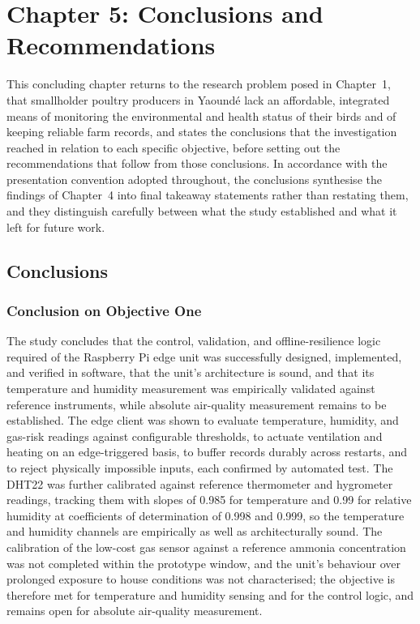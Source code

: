 \documentclass[12pt,a4paper]{report}
\begin{document}
\chapter{Chapter 5: Conclusions and Recommendations}
\setcounter{section}{0}
\renewcommand{\thesection}{5.\arabic{section}}
\renewcommand{\thesubsection}{5.\arabic{section}.\arabic{subsection}}

This concluding chapter returns to the research problem posed in Chapter~1, that smallholder poultry producers in Yaound\'e lack an affordable, integrated means of monitoring the environmental and health status of their birds and of keeping reliable farm records, and states the conclusions that the investigation reached in relation to each specific objective, before setting out the recommendations that follow from those conclusions. In accordance with the presentation convention adopted throughout, the conclusions synthesise the findings of Chapter~4 into final takeaway statements rather than restating them, and they distinguish carefully between what the study established and what it left for future work.

\section{Conclusions}

\subsection{Conclusion on Objective One}

The study concludes that the control, validation, and offline-resilience logic required of the Raspberry Pi edge unit was successfully designed, implemented, and verified in software, that the unit's architecture is sound, and that its temperature and humidity measurement was empirically validated against reference instruments, while absolute air-quality measurement remains to be established. The edge client was shown to evaluate temperature, humidity, and gas-risk readings against configurable thresholds, to actuate ventilation and heating on an edge-triggered basis, to buffer records durably across restarts, and to reject physically impossible inputs, each confirmed by automated test. The DHT22 was further calibrated against reference thermometer and hygrometer readings, tracking them with slopes of 0.985 for temperature and 0.99 for relative humidity at coefficients of determination of 0.998 and 0.999, so the temperature and humidity channels are empirically as well as architecturally sound. The calibration of the low-cost gas sensor against a reference ammonia concentration was not completed within the prototype window, and the unit's behaviour over prolonged exposure to house conditions was not characterised; the objective is therefore met for temperature and humidity sensing and for the control logic, and remains open for absolute air-quality measurement.
\end{document}
